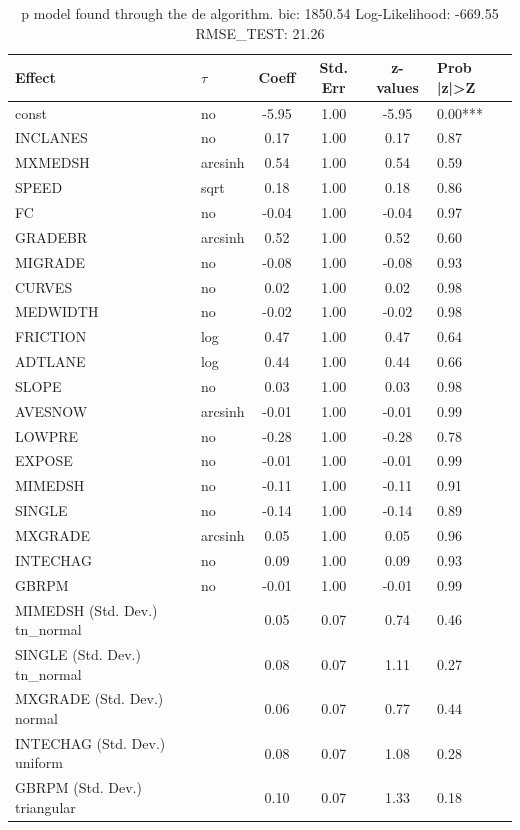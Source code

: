 \begin{table}
	\caption{p model found through the de algorithm. bic: 1850.54 Log-Likelihood: -669.55 RMSE_TEST: 21.26}
	\begin{center}
		\begin{tabular}{|l|l|c|c|c|l|}
			\hline
			Effect & $\tau$ & Coeff & Std. Err & z-values & Prob |z|>Z \\
			\hline
			const & no & -5.95 & 1.00 & -5.95 & 0.00*** \\
			\hline
			INCLANES & no & 0.17 & 1.00 & 0.17 & 0.87 \\
			\hline
			MXMEDSH & arcsinh & 0.54 & 1.00 & 0.54 & 0.59 \\
			\hline
			SPEED & sqrt & 0.18 & 1.00 & 0.18 & 0.86 \\
			\hline
			FC & no & -0.04 & 1.00 & -0.04 & 0.97 \\
			\hline
			GRADEBR & arcsinh & 0.52 & 1.00 & 0.52 & 0.60 \\
			\hline
			MIGRADE & no & -0.08 & 1.00 & -0.08 & 0.93 \\
			\hline
			CURVES & no & 0.02 & 1.00 & 0.02 & 0.98 \\
			\hline
			MEDWIDTH & no & -0.02 & 1.00 & -0.02 & 0.98 \\
			\hline
			FRICTION & log & 0.47 & 1.00 & 0.47 & 0.64 \\
			\hline
			ADTLANE & log & 0.44 & 1.00 & 0.44 & 0.66 \\
			\hline
			SLOPE & no & 0.03 & 1.00 & 0.03 & 0.98 \\
			\hline
			AVESNOW & arcsinh & -0.01 & 1.00 & -0.01 & 0.99 \\
			\hline
			LOWPRE & no & -0.28 & 1.00 & -0.28 & 0.78 \\
			\hline
			EXPOSE & no & -0.01 & 1.00 & -0.01 & 0.99 \\
			\hline
			MIMEDSH & no & -0.11 & 1.00 & -0.11 & 0.91 \\
			\hline
			SINGLE & no & -0.14 & 1.00 & -0.14 & 0.89 \\
			\hline
			MXGRADE & arcsinh & 0.05 & 1.00 & 0.05 & 0.96 \\
			\hline
			INTECHAG & no & 0.09 & 1.00 & 0.09 & 0.93 \\
			\hline
			GBRPM & no & -0.01 & 1.00 & -0.01 & 0.99 \\
			\hline
			MIMEDSH (Std. Dev.) tn_normal &  & 0.05 & 0.07 & 0.74 & 0.46 \\
			\hline
			SINGLE (Std. Dev.) tn_normal &  & 0.08 & 0.07 & 1.11 & 0.27 \\
			\hline
			MXGRADE (Std. Dev.) normal &  & 0.06 & 0.07 & 0.77 & 0.44 \\
			\hline
			INTECHAG (Std. Dev.) uniform &  & 0.08 & 0.07 & 1.08 & 0.28 \\
			\hline
			GBRPM (Std. Dev.) triangular &  & 0.10 & 0.07 & 1.33 & 0.18 \\
			\hline
		\end{tabular}
	\end{center}
\end{table}